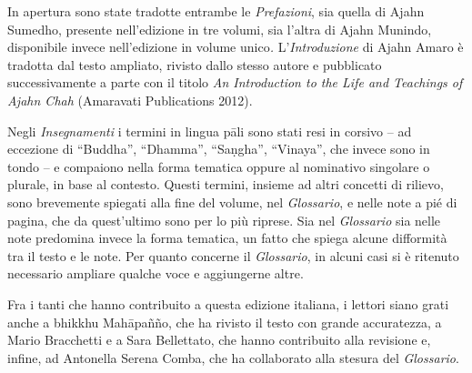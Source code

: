 In apertura sono state tradotte entrambe le \emph{Prefazioni}, sia
quella di Ajahn Sumedho, presente nell'edizione in tre volumi, sia
l'altra di Ajahn Munindo, disponibile invece nell'edizione in volume
unico\emph{.} L'\emph{Introduzione} di Ajahn Amaro è tradotta dal testo
ampliato, rivisto dallo stesso autore e pubblicato successivamente a
parte con il titolo \emph{An Introduction to the Life and Teachings of
Ajahn Chah} (Amaravati Publications 2012).

Negli \emph{Insegnamenti} i termini in lingua pāli sono stati resi in
corsivo -- ad eccezione di ``Buddha'', ``Dhamma'', ``Saṇgha'',
``Vinaya'', che invece sono in tondo -- e compaiono nella forma tematica
oppure al nominativo singolare o plurale, in base al contesto. Questi
termini, insieme ad altri concetti di rilievo, sono brevemente spiegati
alla fine del volume, nel \emph{Glossario}, e nelle note a pié di
pagina, che da quest'ultimo sono per lo più riprese. Sia nel
\emph{Glossario} sia nelle note predomina invece la forma tematica, un
fatto che spiega alcune difformità tra il testo e le note. Per quanto
concerne il \emph{Glossario}, in alcuni casi si è ritenuto necessario
ampliare qualche voce e aggiungerne altre.

Fra i tanti che hanno contribuito a questa edizione italiana, i lettori
siano grati anche a bhikkhu Mahāpañño, che ha rivisto il testo con
grande accuratezza, a Mario Bracchetti e a Sara Bellettato, che hanno
contribuito alla revisione e, infine, ad Antonella Serena Comba, che ha
collaborato alla stesura del \emph{Glossario}.

